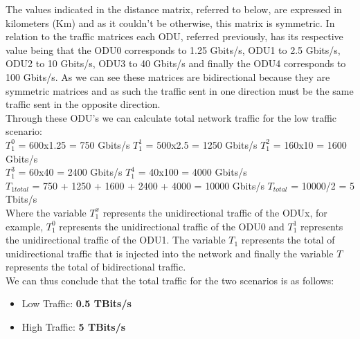 \vspace{17pt}

The values indicated in the distance matrix, referred to below, are expressed in kilometers (Km) and as it couldn't be otherwise, this matrix is symmetric.
In relation to the traffic matrices each ODU, referred previously, has its respective value being that the ODU0 corresponds to 1.25 Gbits/s, ODU1 to 2.5 Gbits/s, ODU2 to 10 Gbits/s, ODU3 to 40 Gbits/s and finally the ODU4 corresponds to 100 Gbits/s.
As we can see these matrices are bidirectional because they are symmetric matrices and as such the traffic sent in one direction must be the same traffic sent in the opposite direction. \\

Through these ODU's we can calculate total network traffic for the low traffic scenario:\\

$T_1^0$ = 600x1.25 = 750 Gbits/s \quad
$T_1^1$ = 500x2.5 = 1250 Gbits/s \quad
$T_1^2$ = 160x10 = 1600 Gbits/s \\

$T_1^3$ = 60x40 = 2400 Gbits/s \quad
$T_1^4$ = 40x100 = 4000 Gbits/s \\

$T_{1total}$ = 750 + 1250 + 1600 + 2400 + 4000 = 10000 Gbits/s \qquad
$T_{total}$ = 10000/2 = 5 Tbits/s\\

Where the variable $T_1^x$ represents the unidirectional traffic of the ODUx, for example, $T_1^0$ represents the unidirectional traffic of the ODU0 and $T_1^1$ represents the unidirectional traffic of the ODU1. The variable $T_{1}$ represents the total of unidirectional traffic that is injected into the network and finally the variable $T$ represents the total of bidirectional traffic.\\

We can thus conclude that the total traffic for the two scenarios is as follows:
\begin{itemize}
  \item Low Traffic: \textbf{0.5 TBits/s}
  \item High Traffic: \textbf{5 TBits/s}
\end{itemize}

